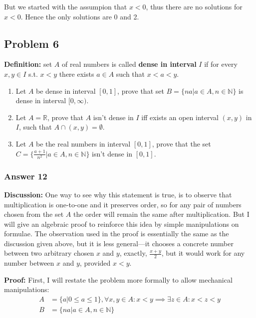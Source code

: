 \documentclass[11pt]{article}
\begin{document}
But we started with the assumpion that $x<0$, thus there are no solutions
for $x<0$.  Hence the only solutions are 0 and 2.
\subsection{Problem 6}
\label{sec-1-6}
\textbf{Definition:} set $A$ of real numbers is called \textbf{dense in interval} $I$ if
for every $x, y \in I$ s.t. $x < y$ there exists $a \in A$ such that
$x < a < y$.

\begin{enumerate}
\item Let $A$ be dense in interval $[0,1]$, prove that set 
      $B=\{na|a \in A, n \in \mathbb{N}\}$ is dense in interval $[0, \infty)$.
\item Let $A=\mathbb{R}$, prove that $A$ isn't dense in $I$ iff exists an
open interval $(x, y)$ in $I$, such that $A \cap (x, y) = \emptyset$.
\item Let $A$ be the real numbers in interval $[0,1]$, prove that the set
      $C=\{\frac{a+1}{n^2} | a \in A, n \in \mathbb{N}\}$ isn't dense in
      $[0,1]$.
\end{enumerate}

\subsubsection{Answer 12}
\label{sec-1-6-1}
\textbf{Discussion:} One way to see why this statement is true, is to observe that
multiplication is one-to-one and it preserves order, so for any pair of
numbers chosen from the set $A$ the order will remain the same after
multiplication.  But I will give an algebraic proof to reinforce this idea
by simple manipulations on formulae.  The observation used in the proof is
essentially the same as the discussion given above, but it is less
general---it chooses a concrete number between two arbitrary chosen $x$ and
$y$, exactly, $\frac{x+y}{2}$, but it would work for any number between $x$
and $y$, provided $x<y$.

\textbf{Proof:} First, I will restate the problem more formally to allow
mechanical manipulations:
\begin{equation*}
  \begin{aligned}
    A &= \{ a | 0 \leq a \leq 1\},
    \forall x, y \in A: x < y \implies \exists z \in A: x < z < y \\
    B &= \{ na | a \in A, n \in \mathbb{N} \}
  \end{aligned}
\end{equation*}
\end{document}
